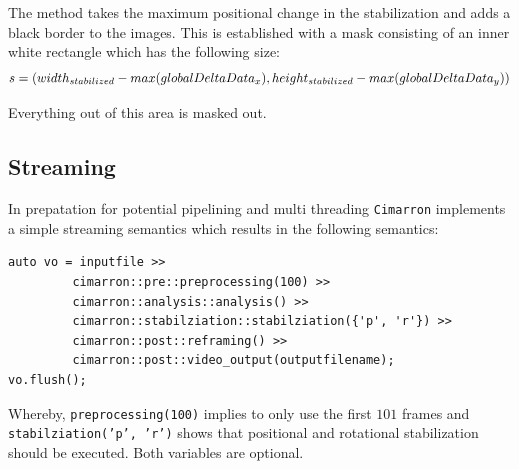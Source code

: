 The method takes the maximum positional change in the stabilization and adds a black border to the images. This is established with a mask consisting of an inner white rectangle which has the following size:
\begin{equation*}\centering
    \begin{split}
        s = (width_{stabilized} - max(globalDeltaData_x), height_{stabilized} - max(globalDeltaData_y))
    \end{split}
\end{equation*}

Everything out of this area is masked out.

\subsection{Streaming}
In prepatation for potential pipelining and multi threading \texttt{Cimarron} implements a simple streaming semantics which results in the following semantics:
\begin{lstlisting}[caption={Cimarron semantics},label=lst:fin]
auto vo = inputfile >>
         cimarron::pre::preprocessing(100) >>
         cimarron::analysis::analysis() >>
         cimarron::stabilziation::stabilziation({'p', 'r'}) >>
         cimarron::post::reframing() >>
         cimarron::post::video_output(outputfilename);
vo.flush();
\end{lstlisting}

Whereby, \texttt{preprocessing(100)} implies to only use the first $101$ frames and \texttt{stabilziation({'p', 'r'})} shows that positional and rotational stabilization should be executed. Both variables are optional.


